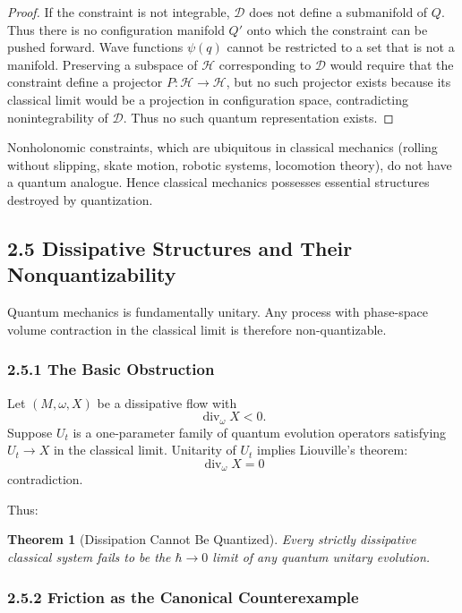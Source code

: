 \documentclass[12pt,oneside]{book}
\theoremstyle{plain}
\newtheorem{theorem}{Theorem}[chapter]
\theoremstyle{definition}
\begin{document}
\begin{proof}
If the constraint is not integrable, $\mathcal{D}$ does not define a submanifold of $Q$.  
Thus there is no configuration manifold $Q'$ onto which the constraint can be pushed forward.  
Wave functions $\psi(q)$ cannot be restricted to a set that is not a manifold.  
Preserving a subspace of $\mathcal{H}$ corresponding to $\mathcal{D}$ would require that the constraint define a projector $P:\mathcal{H}\to\mathcal{H}$, but no such projector exists because its classical limit would be a projection in configuration space, contradicting nonintegrability of $\mathcal{D}$.  
Thus no such quantum representation exists.
\end{proof}

Nonholonomic constraints, which are ubiquitous in classical mechanics (rolling without slipping, skate motion, robotic systems, locomotion theory), do not have a quantum analogue.  
Hence classical mechanics possesses essential structures destroyed by quantization.

\subsection{2.5 Dissipative Structures and Their Nonquantizability}

Quantum mechanics is fundamentally unitary. Any process with phase-space volume contraction in the classical limit is therefore non-quantizable.

\subsubsection*{2.5.1 The Basic Obstruction}

Let $(M,\omega,X)$ be a dissipative flow with 
\[
\operatorname{div}_\omega X < 0.
\]
Suppose $U_t$ is a one-parameter family of quantum evolution operators satisfying $U_t \to X$ in the classical limit.  
Unitarity of $U_t$ implies Liouville's theorem:
\[
\operatorname{div}_\omega X = 0
\]
contradiction.

Thus:

\begin{theorem}[Dissipation Cannot Be Quantized]
Every strictly dissipative classical system fails to be the $\hbar \to 0$ limit of any quantum unitary evolution.
\end{theorem}

\subsubsection*{2.5.2 Friction as the Canonical Counterexample}
\end{document}
